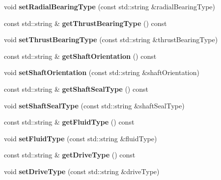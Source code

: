 \begin{DoxyCompactItemize}
void {\bfseries set\+Radial\+Bearing\+Type} (const std\+::string \&radial\+Bearing\+Type)
\item 
\mbox{\label{class_pump_data_a458d9be817daefefc245f458e1143b36}} 
const std\+::string \& {\bfseries get\+Thrust\+Bearing\+Type} () const
\item 
\mbox{\label{class_pump_data_ab9bcb47cc75a022c2944f125b156e10d}} 
void {\bfseries set\+Thrust\+Bearing\+Type} (const std\+::string \&thrust\+Bearing\+Type)
\item 
\mbox{\label{class_pump_data_a1804018040f4824c9845570de363f8a7}} 
const std\+::string \& {\bfseries get\+Shaft\+Orientation} () const
\item 
\mbox{\label{class_pump_data_a54e4d9914a3aeeb3762b9566188e9311}} 
void {\bfseries set\+Shaft\+Orientation} (const std\+::string \&shaft\+Orientation)
\item 
\mbox{\label{class_pump_data_a61821a8debd78d41a2834af7d62a7f96}} 
const std\+::string \& {\bfseries get\+Shaft\+Seal\+Type} () const
\item 
\mbox{\label{class_pump_data_a15ce808feb633f5fae6f990564e1f6c9}} 
void {\bfseries set\+Shaft\+Seal\+Type} (const std\+::string \&shaft\+Seal\+Type)
\item 
\mbox{\label{class_pump_data_aa5bb3547205abd1ac921f7d6fb75b551}} 
const std\+::string \& {\bfseries get\+Fluid\+Type} () const
\item 
\mbox{\label{class_pump_data_ab67c5664ae173ce0f431787feecc450a}} 
void {\bfseries set\+Fluid\+Type} (const std\+::string \&fluid\+Type)
\item 
\mbox{\label{class_pump_data_aaf89ae91c3492a3a644650658bd0fac3}} 
const std\+::string \& {\bfseries get\+Drive\+Type} () const
\item 
\mbox{\label{class_pump_data_add02f3bff0ba5557f96e73b3abf7d563}} 
void {\bfseries set\+Drive\+Type} (const std\+::string \&drive\+Type)
\item 

\end{DoxyCompactItemize}
